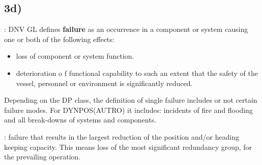 \subsection*{3d)} \label{Sec:3d}

: 
DNV GL defines \textbf{failure} as an occurrence in a component or system causing one or both of the following effects:
\begin{itemize}
    \item loss of component or system function.
    \item deterioration o f functional capability to such an extent that the safety of the vessel, personnel or environment is significantly reduced.
\end{itemize}

Depending on the DP class, the definition of single failure includes or not certain failure modes. For DYNPOS(AUTRO) it includes: incidents of fire and flooding and all break-downs of systems and components.

: failure that results in the largest reduction of the position and/or heading keeping capacity. This means loss of the most significant redundancy group, for the prevailing operation.

